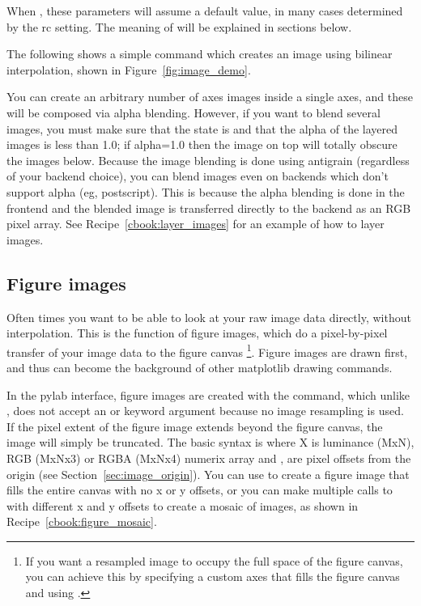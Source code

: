 \documentclass[twoside]{book}
\begin{document}
When , these parameters will assume a default value, in
many cases determined by the rc setting.  The meaning of  will be explained in sections below.

The following shows a simple command which creates an image using
bilinear interpolation, shown in Figure~\ref{fig:image_demo}.




You can create an arbitrary number of axes images inside a single
axes, and these will be composed via alpha blending.  However, if you
want to blend several images, you must make sure that the
 state is  and that the alpha of the
layered images is less than 1.0; if alpha=1.0 then the image on top
will totally obscure the images below.  Because the image blending is
done using antigrain (regardless of your backend choice), you can
blend images even on backends which don't support alpha (eg,
postscript).  This is because the alpha blending is done in the
frontend and the blended image is transferred directly to the backend
as an RGB pixel array.  See Recipe~\ref{cbook:layer_images} for an example of
how to layer images.


\subsection{Figure images}
\label{sec:image_figure}
Often times you want to be able to look at your raw image data
directly, without interpolation.  This is the function of figure
images, which do a pixel-by-pixel transfer of your image data to the
figure canvas \footnote{If you want a resampled image to occupy the
  full space of the figure canvas, you can achieve this by specifying
  a custom axes that fills the figure canvas  and using .}.  Figure images are drawn first,
and thus can become the background of other matplotlib drawing
commands.

In the pylab interface, figure images are created with the
 command, which unlike , does not
accept an  or  keyword argument
because no image resampling is used.  If the pixel extent of the
figure image extends beyond the figure canvas, the image will simply
be truncated.  The basic syntax is 
where X is luminance (MxN), RGB (MxNx3) or RGBA (MxNx4) numerix array
and ,  are pixel offsets from the origin (see
Section~\ref{sec:image_origin}).  You can use  to create a
figure image that fills the entire canvas with no x or y offsets, or
you can make multiple calls to  with different x and
y offsets to create a mosaic of images, as shown in
Recipe~\ref{cbook:figure_mosaic}.
\end{document}
